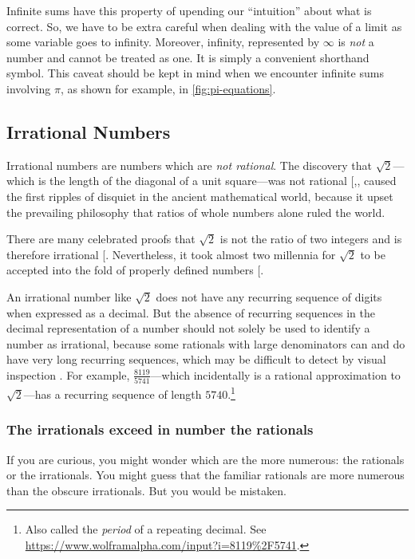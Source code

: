 \documentclass[
  a4paper,
]{article}
\begin{document}
Infinite sums have this property of upending our ``intuition'' about
what is correct. So, we have to be extra careful when dealing with the
value of a limit as some variable goes to infinity. Moreover, infinity,
represented by \(\infty\) is \emph{not} a number and cannot be treated
as one. It is simply a convenient shorthand symbol. This caveat should
be kept in mind when we encounter infinite sums involving \(\pi\), as
shown for example, in \cref{fig:pi-equations}.

\subsection{Irrational Numbers}\label{irrational-numbers}

Irrational numbers are numbers which are \emph{not rational}. The
discovery that \(\sqrt{2}\)---which is the length of the diagonal of a
unit square---was not rational
{[},\citeproc{ref-clegg2004}{3}{]}, caused the
first ripples of disquiet in the ancient mathematical world, because it
upset the prevailing philosophy that ratios of whole numbers alone ruled
the world.

There are many celebrated proofs that \(\sqrt{2}\) is not the ratio of
two integers and is therefore irrational
{[}\citeproc{ref-bogomolny2018}{4}{]}. Nevertheless, it took almost two
millennia for \(\sqrt{2}\) to be accepted into the fold of properly
defined numbers {[}\citeproc{ref-cepelewicz2024}{5}{]}.

An irrational number like \(\sqrt{2}\) does not have any recurring
sequence of digits when expressed as a decimal. But the absence of
recurring sequences in the decimal representation of a number should not
solely be used to identify a number as irrational, because some
rationals with large denominators can and do have very long recurring
sequences, which may be difficult to detect by visual inspection . For
example, \(\frac{8119}{5741}\)---which incidentally is a rational
approximation to \(\sqrt{2}\)---has a recurring sequence of length
\(5740\).\footnote{Also called the \emph{period} of a repeating decimal.
  See \url{https://www.wolframalpha.com/input?i=8119\%2F5741}.}

\subsubsection{The irrationals exceed in number the
rationals}\label{the-irrationals-exceed-in-number-the-rationals}

If you are curious, you might wonder which are the more numerous: the
rationals or the irrationals. You might guess that the familiar
rationals are more numerous than the obscure irrationals. But you would
be mistaken.
\end{document}
